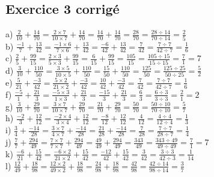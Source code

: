 \documentclass{article}
\begin{document}
\subsection*{Exercice 3 corrigé}
a) $\frac{2}{10}+\frac{14}{70}=\frac{2\times7}{10\times7}+\frac{14}{70}=\frac{14}{70}+\frac{14}{70}=\frac{28}{70}=\frac{28\div14}{70\div14}=\frac{2}{5}$\\ 
\vspace{10 mm}
b) $\frac{-1}{7}+\frac{13}{42}=\frac{-1\times6}{7\times6}+\frac{13}{42}=\frac{-6}{42}+\frac{13}{42}=\frac{7}{42}=\frac{7\div7}{42\div7}=\frac{1}{6}$\\ 
\vspace{10 mm}
c) $\frac{2}{5}+\frac{99}{15}=\frac{2\times3}{5\times3}+\frac{99}{15}=\frac{6}{15}+\frac{99}{15}=\frac{105}{15}=\frac{105\div15}{15\div15}=\frac{7}{1}=7$\\ 
\vspace{10 mm}
d) $\frac{3}{10}+\frac{110}{50}=\frac{3\times5}{10\times5}+\frac{110}{50}=\frac{15}{50}+\frac{110}{50}=\frac{125}{50}=\frac{125\div25}{50\div25}=\frac{5}{2}$\\ 
\vspace{10 mm}
e) $\frac{5}{21}+\frac{-3}{42}=\frac{5\times2}{21\times2}+\frac{-3}{42}=\frac{10}{42}+\frac{-3}{42}=\frac{7}{42}=\frac{7\div7}{42\div7}=\frac{1}{6}$\\ 
\vspace{10 mm}
f) $\frac{-5}{1}+\frac{21}{3}=\frac{-5\times3}{1\times3}+\frac{21}{3}=\frac{-15}{3}+\frac{21}{3}=\frac{6}{3}=\frac{6\div3}{3\div3}=\frac{2}{1}=2$\\ 
\vspace{10 mm}
g) $\frac{3}{10}+\frac{29}{70}=\frac{3\times7}{10\times7}+\frac{29}{70}=\frac{21}{70}+\frac{29}{70}=\frac{50}{70}=\frac{50\div10}{70\div10}=\frac{5}{7}$\\ 
\vspace{10 mm}
h) $\frac{-2}{3}+\frac{12}{12}=\frac{-2\times4}{3\times4}+\frac{12}{12}=\frac{-8}{12}+\frac{12}{12}=\frac{4}{12}=\frac{4\div4}{12\div4}=\frac{1}{3}$\\ 
\vspace{10 mm}
i) $\frac{3}{4}+\frac{-14}{28}=\frac{3\times7}{4\times7}+\frac{-14}{28}=\frac{21}{28}+\frac{-14}{28}=\frac{7}{28}=\frac{7\div7}{28\div7}=\frac{1}{4}$\\ 
\vspace{10 mm}
j) $\frac{7}{7}+\frac{294}{49}=\frac{7\times7}{7\times7}+\frac{294}{49}=\frac{49}{49}+\frac{294}{49}=\frac{343}{49}=\frac{343\div49}{49\div49}=\frac{7}{1}=7$\\ 
\vspace{10 mm}
k) $\frac{-6}{21}+\frac{15}{42}=\frac{-6\times2}{21\times2}+\frac{15}{42}=\frac{-12}{42}+\frac{15}{42}=\frac{3}{42}=\frac{3\div3}{42\div3}=\frac{1}{14}$\\ 
\vspace{10 mm}
l) $\frac{12}{49}+\frac{18}{98}=\frac{12\times2}{49\times2}+\frac{18}{98}=\frac{24}{98}+\frac{18}{98}=\frac{42}{98}=\frac{42\div14}{98\div14}=\frac{3}{7}$\\ 
\vspace{10 mm}
\newpage
\end{document}

